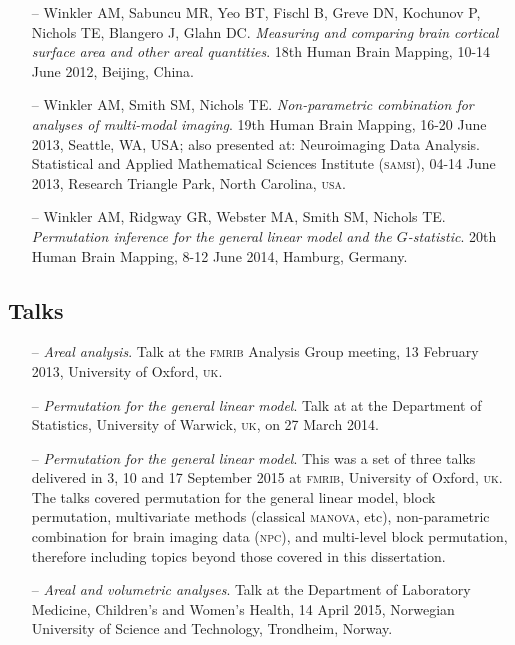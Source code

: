 \begin{itemize}
\item[--] Winkler AM, Sabuncu MR, Yeo BT, Fischl B, Greve DN, Kochunov P, Nichols TE, Blangero J, Glahn DC. \emph{Measuring and comparing brain cortical surface area and other areal quantities}. 18th Human Brain Mapping, 10-14 June 2012, Beijing, China.
\item[--] Winkler AM, Smith SM, Nichols TE. \emph{Non-parametric combination for analyses of multi-modal imaging}. 19th Human Brain Mapping, 16-20 June 2013, Seattle, WA, USA; also presented at: Neuroimaging Data Analysis. Statistical and Applied Mathematical Sciences Institute (\textsc{samsi}), 04-14 June 2013, Research Triangle Park, North Carolina, \textsc{usa}.
\item[--] Winkler AM, Ridgway GR, Webster MA, Smith SM, Nichols TE. \emph{Permutation inference for the general linear model and the $G$-statistic}. 20th Human Brain Mapping, 8-12 June 2014, Hamburg, Germany.
\end{itemize}

\subsection{Talks}

\begin{itemize}
\item[--] \emph{Areal analysis}. Talk at the \textsc{fmrib} Analysis Group meeting, 13 February 2013, University of Oxford, \textsc{uk}.
\item[--] \emph{Permutation for the general linear model}. Talk at at the Department of Statistics, University of Warwick, \textsc{uk}, on 27 March 2014.
\item[--] \emph{Permutation for the general linear model}. This was a set of three talks delivered in 3, 10 and 17 September 2015 at \textsc{fmrib}, University of Oxford, \textsc{uk}. The talks covered permutation for the general linear model, block permutation, multivariate methods (classical \textsc{manova}, etc), non-parametric combination for brain imaging data (\textsc{npc}), and multi-level block permutation, therefore including topics beyond those covered in this dissertation.
\item[--] \emph{Areal and volumetric analyses}. Talk at the Department of Laboratory Medicine, Children’s and Women’s Health, 14 April 2015, Norwegian University of Science and Technology, Trondheim, Norway.

\end{itemize}

